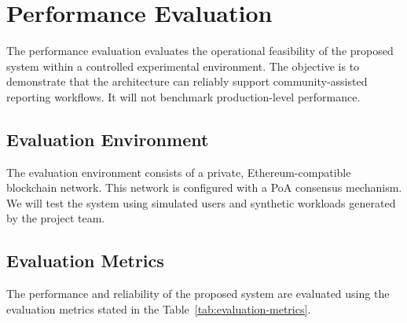 \section{Performance Evaluation}

The performance evaluation evaluates the operational feasibility of the proposed system within a controlled experimental environment. The objective is to demonstrate that the architecture can reliably support community-assisted reporting workflows. It will not benchmark production-level performance. 

\subsection{Evaluation Environment}

The evaluation environment consists of a private, Ethereum-compatible blockchain network. This network is configured with a \ac{PoA} consensus mechanism. We will test the system using simulated users and synthetic workloads generated by the project team.

\subsection{Evaluation Metrics}

The performance and reliability of the proposed system are evaluated using the evaluation metrics stated in the Table~\ref{tab:evaluation-metrics}.

